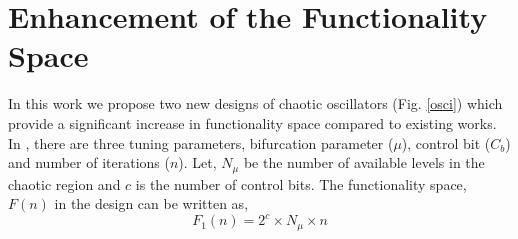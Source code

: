 \documentclass[conference]{IEEEtran}
\begin{document}
\begin{table*}

  \centering
  \caption{\small{Three different configurations for six logic functions.}}
\label{table:configurations}
  \end{table*}
  
\section{Enhancement of the Functionality Space}
\label{sec_func_space}
In this work we propose two new designs of chaotic oscillators (Fig. \ref{osci}) which provide a significant increase in functionality space compared to existing works. In \cite{kia2016simple}, there are three tuning parameters, bifurcation parameter ($\mu$), control bit ($C_b$) and number of iterations ($n$). Let, $N_\mu$ be the number of available levels in the chaotic region and $c$ is the number of control bits. The functionality space, $F(n)$ in the design can be written as,
\begin{equation}
F_1(n) = 2^c\times N_{\mu} \times n 
\label{space1}
\end{equation}
\end{document}
